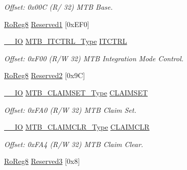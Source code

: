 \begin{DoxyCompactItemize}
\begin{DoxyCompactList}\small\item\em Offset\+: 0x00C (R/ 32) M\+TB Base. \end{DoxyCompactList}\item 
\mbox{\hyperlink{group___s_a_m_d21_e15_a__definitions_ga0d957f1433aaf5d70e4dc2b68288442d}{Ro\+Reg8}} \mbox{\hyperlink{struct_mtb_aa2f0dd1af088549568cc40e80212606c}{Reserved1}} \mbox{[}0x\+E\+F0\mbox{]}
\item 
\mbox{\hyperlink{core__cm0plus_8h_aec43007d9998a0a0e01faede4133d6be}{\+\_\+\+\_\+\+IO}} \mbox{\hyperlink{union_m_t_b___i_t_c_t_r_l___type}{M\+T\+B\+\_\+\+I\+T\+C\+T\+R\+L\+\_\+\+Type}} \mbox{\hyperlink{struct_mtb_a10ea54b49af479296049633735814110}{I\+T\+C\+T\+RL}}
\begin{DoxyCompactList}\small\item\em Offset\+: 0x\+F00 (R/W 32) M\+TB Integration Mode Control. \end{DoxyCompactList}\item 
\mbox{\hyperlink{group___s_a_m_d21_e15_a__definitions_ga0d957f1433aaf5d70e4dc2b68288442d}{Ro\+Reg8}} \mbox{\hyperlink{struct_mtb_a69c8a77ebefe06c9f0eb3c710d5a7c56}{Reserved2}} \mbox{[}0x9\+C\mbox{]}
\item 
\mbox{\hyperlink{core__cm0plus_8h_aec43007d9998a0a0e01faede4133d6be}{\+\_\+\+\_\+\+IO}} \mbox{\hyperlink{union_m_t_b___c_l_a_i_m_s_e_t___type}{M\+T\+B\+\_\+\+C\+L\+A\+I\+M\+S\+E\+T\+\_\+\+Type}} \mbox{\hyperlink{struct_mtb_ade6fdf33852d4eea3792e2eb37d29f87}{C\+L\+A\+I\+M\+S\+ET}}
\begin{DoxyCompactList}\small\item\em Offset\+: 0x\+F\+A0 (R/W 32) M\+TB Claim Set. \end{DoxyCompactList}\item 
\mbox{\hyperlink{core__cm0plus_8h_aec43007d9998a0a0e01faede4133d6be}{\+\_\+\+\_\+\+IO}} \mbox{\hyperlink{union_m_t_b___c_l_a_i_m_c_l_r___type}{M\+T\+B\+\_\+\+C\+L\+A\+I\+M\+C\+L\+R\+\_\+\+Type}} \mbox{\hyperlink{struct_mtb_a754151aa0b1892bb619338aa4144411c}{C\+L\+A\+I\+M\+C\+LR}}
\begin{DoxyCompactList}\small\item\em Offset\+: 0x\+F\+A4 (R/W 32) M\+TB Claim Clear. \end{DoxyCompactList}\item 
\mbox{\hyperlink{group___s_a_m_d21_e15_a__definitions_ga0d957f1433aaf5d70e4dc2b68288442d}{Ro\+Reg8}} \mbox{\hyperlink{struct_mtb_aa6dedadaa878ede1a7a75ee4c823f3b7}{Reserved3}} \mbox{[}0x8\mbox{]}

\end{DoxyCompactItemize}
